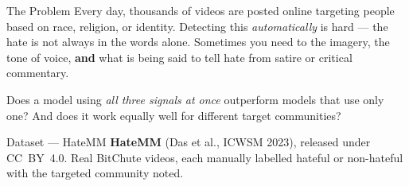 \vspace{6mm}

\noindent
\begin{minipage}[t]{0.465\textwidth}

  \begin{pbox}{The Problem}
    Every day, thousands of videos are posted online targeting people
    based on race, religion, or identity.
    Detecting this \emph{automatically} is hard --- the hate is not
    always in the words alone.
    Sometimes you need to
    \vtag{} the imagery,
    \atag{} the tone of voice, \textbf{and}
    \ttag{} what is being said
    to tell hate from satire or critical commentary.

    \vspace{4mm}
    Does a model using \emph{all three signals at once}
    outperform models that use only one?
    And does it work equally well for different target communities?
  \end{pbox}

  \vspace{5mm}

  \begin{pbox}{Dataset --- HateMM}
    \textbf{HateMM} (Das et al., ICWSM 2023), released under CC~BY~4.0.
    Real BitChute videos, each manually labelled hateful or non-hateful
    with the targeted community noted.


\end{pbox}
\end{minipage}
